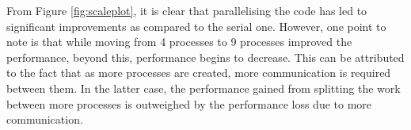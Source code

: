 \documentclass[11pt]{article}
\begin{document}
        \vspace{0.3cm}
        From Figure \ref{fig:scaleplot}, it is clear that parallelising the code has led to significant improvements as compared to the serial one. However, one point to note is that while moving from 4 processes to 9 processes improved the performance, beyond this, performance begins to decrease. This can be attributed to the fact that as more processes are created, more communication is required between them. In the latter case, the performance gained from splitting the work between more processes is outweighed by the performance loss due to more communication.

        
    	
\end{document}
